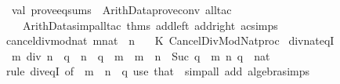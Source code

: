 \begin{isabellebody}
\isanewline
\ \ val\ prove{\isacharunderscore}{\kern0pt}eq{\isacharunderscore}{\kern0pt}sums\ {\isacharequal}{\kern0pt}\ Arith{\isacharunderscore}{\kern0pt}Data{\isachardot}{\kern0pt}prove{\isacharunderscore}{\kern0pt}conv{}\ all{\isacharunderscore}{\kern0pt}tac\isanewline
\ \ \ \ {\isacharparenleft}{\kern0pt}Arith{\isacharunderscore}{\kern0pt}Data{\isachardot}{\kern0pt}simp{\isacharunderscore}{\kern0pt}all{\isacharunderscore}{\kern0pt}tac\ {\isacharat}{\kern0pt}{\isacharbraceleft}{\kern0pt}thms\ add{\isacharunderscore}{\kern0pt}{}{\isacharunderscore}{\kern0pt}left\ add{\isacharunderscore}{\kern0pt}{}{\isacharunderscore}{\kern0pt}right\ ac{\isacharunderscore}{\kern0pt}simps{\isacharbraceright}{\kern0pt}{\isacharparenright}{\kern0pt}\isanewline
{\isacharparenright}{\kern0pt}\isanewline
{\isacartoucheclose}\isanewline
\isanewline
{}\isamarkupfalse%
\ cancel{\isacharunderscore}{\kern0pt}div{\isacharunderscore}{\kern0pt}mod{\isacharunderscore}{\kern0pt}nat\ {\isacharparenleft}{\kern0pt}{\isachardoublequoteopen}{\isacharparenleft}{\kern0pt}m{\isacharcolon}{\kern0pt}{\isacharcolon}{\kern0pt}nat{\isacharparenright}{\kern0pt}\ {\isacharplus}{\kern0pt}\ n{\isachardoublequoteclose}{\isacharparenright}{\kern0pt}\ {\isacharequal}{\kern0pt}\isanewline
\ \ {\isacartoucheopen}K\ Cancel{\isacharunderscore}{\kern0pt}Div{\isacharunderscore}{\kern0pt}Mod{\isacharunderscore}{\kern0pt}Nat{\isachardot}{\kern0pt}proc{\isacartoucheclose}%
\endisatagML
{\isafoldML}%
%
\isadelimML
%
\endisadelimML
\isanewline
\isanewline
{}\isamarkupfalse%
\ div{\isacharunderscore}{\kern0pt}nat{\isacharunderscore}{\kern0pt}eqI{\isacharcolon}{\kern0pt}\isanewline
\ \ {\isachardoublequoteopen}m\ div\ n\ {\isacharequal}{\kern0pt}\ q{\isachardoublequoteclose}\ \ {\isachardoublequoteopen}n\ {\isacharasterisk}{\kern0pt}\ q\ {\isasymle}\ m{\isachardoublequoteclose}\ \ {\isachardoublequoteopen}m\ {\isacharless}{\kern0pt}\ n\ {\isacharasterisk}{\kern0pt}\ Suc\ q{\isachardoublequoteclose}\ \ m\ n\ q\ {\isacharcolon}{\kern0pt}{\isacharcolon}{\kern0pt}\ nat\isanewline
%
\isadelimproof
\ \ %
\endisadelimproof
%
\isatagproof
{}\isamarkupfalse%
\ {\isacharparenleft}{\kern0pt}rule\ div{\isacharunderscore}{\kern0pt}eqI\ {\isacharbrackleft}{\kern0pt}of\ {\isacharunderscore}{\kern0pt}\ {\isachardoublequoteopen}m\ {\isacharminus}{\kern0pt}\ n\ {\isacharasterisk}{\kern0pt}\ q{\isachardoublequoteclose}{\isacharbrackright}{\kern0pt}{\isacharparenright}{\kern0pt}\ {\isacharparenleft}{\kern0pt}use\ that\ \ {\isacartoucheopen}simp{\isacharunderscore}{\kern0pt}all\ add{\isacharcolon}{\kern0pt}\ algebra{\isacharunderscore}{\kern0pt}simps{\isacartoucheclose}{\isacharparenright}{\kern0pt}%

\end{isabellebody}
